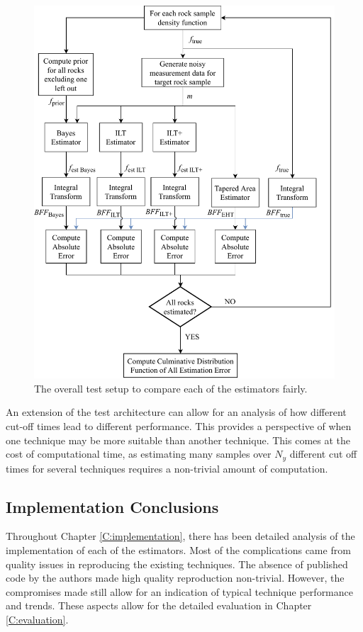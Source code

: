 \begin{figure}[h]
    \centering
    \includegraphics[width=\textwidth]{implementation/test_arch2.pdf}
    \caption{The overall test setup to compare each of the estimators fairly.}
    \label{fig:test_architecture}
\end{figure}



An extension of the test architecture can allow for an analysis of how different cut-off times lead to different performance. This provides a perspective of when one technique may be more suitable than another technique. This comes at the cost of computational time, as estimating many samples over $N_y$ different cut off times for several techniques requires a non-trivial amount of computation. 


\subsection{Implementation Conclusions}

Throughout Chapter \ref{C:implementation}, there has been detailed analysis of the implementation of each of the estimators. Most of the complications came from quality issues in reproducing the existing techniques. The absence of published code by the authors made high quality reproduction non-trivial. However, the compromises made still allow for an indication of typical technique performance and trends. These aspects allow for the detailed evaluation in Chapter \ref{C:evaluation}.






